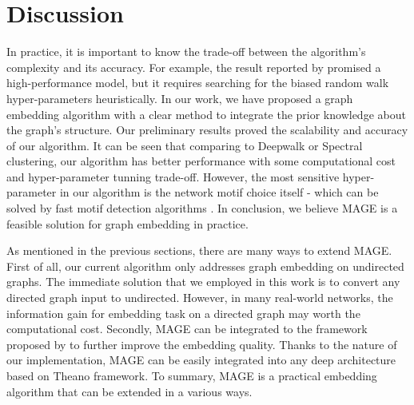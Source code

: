 \documentclass[letterpaper]{article}
\begin{document}
    \section{Discussion}

        In practice, it is important to know the trade-off between the algorithm's complexity
        and its accuracy. For example, the result reported by \cite{node2vec} promised a high-performance
        model, but it requires searching for the biased random walk hyper-parameters
        heuristically. In our work, we have proposed a graph embedding algorithm with a clear
        method to integrate the prior knowledge about the graph's structure. Our preliminary results
        proved the scalability and accuracy of our algorithm. It can be seen that comparing to 
        Deepwalk or Spectral clustering, our algorithm has better performance with some computational
        cost and hyper-parameter tunning trade-off. However, the most sensitive hyper-parameter
        in our algorithm is the network motif choice itself - which can be solved by fast motif detection
        algorithms \cite{motifdecrev}. In conclusion, we believe MAGE is a feasible solution
        for graph embedding in practice.

        As mentioned in the previous sections, there are many ways to extend MAGE\@. First of all,
        our current algorithm only addresses graph embedding on undirected graphs. The immediate 
        solution that we employed in this work is to convert any directed graph input to undirected.
        However, in many real-world networks, the information gain for embedding task on a directed graph
        may worth the computational cost. Secondly, MAGE can be integrated to the framework proposed
        by \cite{planetoid} to further improve the embedding quality. Thanks to the nature of our
        implementation, MAGE can be easily integrated into any deep architecture based on Theano framework.
        To summary, MAGE is a practical embedding algorithm that can be extended in a various ways.

    
    
\end{document}
